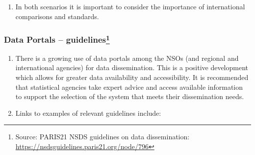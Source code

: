 \documentclass[
]{article}
\providecommand{\tightlist}{%
  \setlength{\itemsep}{0pt}\setlength{\parskip}{0pt}}
\begin{document}
\begin{enumerate}
\def\labelenumi{\arabic{enumi}.}
\setcounter{enumi}{506}
\tightlist
\item
  In both scenarios it is important to consider the importance of
  international comparisons and standards.
\end{enumerate}

\hypertarget{data-portals-guidelines}{%
\subsubsection[Data Portals -- guidelines]{\texorpdfstring{Data Portals -- guidelines\footnote{Source: PARIS21 NSDS guidelines on data dissemination:
  \url{https://nsdsguidelines.paris21.org/node/796}}}{Data Portals -- guidelines}}\label{data-portals-guidelines}}

\begin{enumerate}
\def\labelenumi{\arabic{enumi}.}
\setcounter{enumi}{507}
\item
  There is a growing use of data portals among the NSOs (and regional
  and international agencies) for data dissemination. This is a
  positive development which allows for greater data availability and
  accessibility. It is recommended that statistical agencies take
  expert advice and access available information to support the
  selection of the system that meets their dissemination needs.
\item
  Links to examples of relevant guidelines include:
\end{enumerate}
\end{document}
